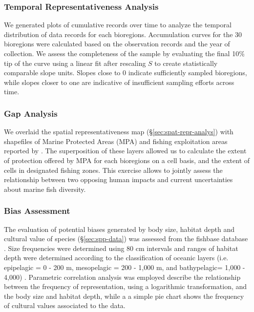 \documentclass[12pt,authoryear]{elsarticle}
\begin{document}
\subsubsection{Temporal Representativeness Analysis}
\label{sec:temp-repr-analys}
We generated plots of cumulative records over time to analyze the temporal distribution of data records for each bioregions. Accumulation curves for the 30 bioregions were calculated based on the observation records and the year of collection. We assess the completeness of the sample by evaluating the final 10\% tip of the curve using a linear fit after rescaling $S$ to create statistically comparable slope units. Slopes close to 0 indicate sufficiently sampled bioregions, while slopes closer to one are indicative of insufficient sampling efforts across time.

\subsubsection{Gap Analysis}
\label{sec:gap-analysis}
We overlaid the spatial representativeness map (\S \ref{sec:spat-repr-analys}) with shapefiles of Marine Protected Areas (MPA) \citep{wcmc2022} and fishing exploitation areas reported by \citep{fao2014}. The superposition of these layers allowed us to calculate the extent of protection offered by MPA for each  bioregions on a cell basis, and the extent of cells in designated fishing zones. This exercise allows to jointly assess the relationship between two opposing human impacts and current uncertainties about marine fish diversity. 

\subsubsection{Bias Assessment}
\label{sec:bias-assessment}
The evaluation of potential biases generated by body size, habitat depth and cultural value of species (\S \ref{sec:spp-data}) was assessed from the fishbase database \citep{froese2021fishbase}. Size frequencies were determined using 80 cm intervals and ranges of habitat depth were determined according to the classification of oceanic layers (i.e. epipelagic = 0 - 200 m, mesopelagic = 200 - 1,000 m, and bathypelagic= 1,000 - 4,000) \citep{costello2010}. Parametric correlation analysis was employed describe the relationship between the frequency of representation, using a logarithmic transformation, and the body size and habitat depth, while a a simple pie chart shows the frequency of cultural values associated to the data.
\end{document}
